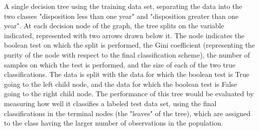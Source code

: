 A single decision tree using the training data set, separating the data into the two classes "disposition less than one year" and "disposition greater than one year". At each decision node of the graph, the tree splits on the variable indicated, represented with two arrows drawn below it. The node indicates the boolean test on which the split is performed, the Gini coefficient (representing the purity of the node with respect to the final classification scheme), the number of samples on which the test is performed, and the size of each of the two true classifications. The data is split with the data for which the boolean test is True going to the left child node, and the data for which the boolean test is False going to the right child node. The performance of this tree would be evaluated by measuring how well it classifies a labeled test data set, using the final classifications in the terminal nodes (the "leaves" of the tree), which are assigned to the class having the larger number of observations in the population.
\label{fig:onetree}